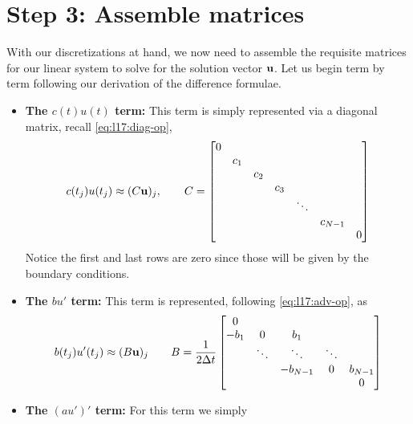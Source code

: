 \section*{Step 3: Assemble matrices}
With our discretizations at hand, we now need to assemble 
the requisite matrices for our linear system to solve for 
the solution vector $\mathbf{u}$. Let us begin term by term 
following our derivation of the difference formulae.

\begin{itemize}
    \item {\bf The $c(t)u(t)$ term:} This term is simply represented
    via a diagonal matrix, recall \eqref{eq:l17:diag-op}, 
    \begin{equation*}
        c(t_j) u(t_j) \approx (C \mathbf{u})_j, \qquad C = 
        \begin{bmatrix}
            0 & & & & & & \\ 
              & c_1 & &  & & &\\
              & & c_2 &  & & &\\
              & & &  c_3 & & &\\ 
              & & &   &  \ddots & & \\
              & & & & &    c_{N-1} & \\ 
              & & & & &    &  0
        \end{bmatrix}
    \end{equation*} 
    Notice the first and last rows are zero since 
    those will be given by the boundary conditions. 
    \item {\bf The $b u'$ term:} This term is 
    represented, following \eqref{eq:l17:adv-op}, as 
    \begin{equation*}
        b(t_j) u'(t_j) \approx (B \mathbf{u})_j \qquad 
        B = \frac{1}{2 \Delta t} 
        \begin{bmatrix}
            0      &        &           &         &         \\ 
            -b_1   & 0      & b_1       &         &         \\ 
                   & \ddots & \ddots    & \ddots  &         \\ 
                   &        & -b_{N-1}  & 0       & b_{N-1} \\
                   &        &           &         & 0
        \end{bmatrix}
    \end{equation*}
    \item {\bf The $(a u')'$ term:} For this term we simply 

\end{itemize}
